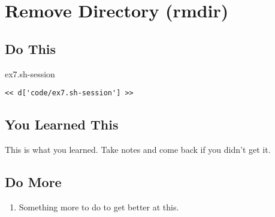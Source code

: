 \chapter{Remove Directory (rmdir)}

\section{Do This}

\begin{code}{ex7.sh-session}
\begin{Verbatim}
<< d['code/ex7.sh-session'] >>
\end{Verbatim}
\end{code}


\section{You Learned This}

This is what you learned.  Take notes and come back if you didn't get it.

\section{Do More}

\begin{enumerate}
\item Something more to do to get better at this.
\end{enumerate}

